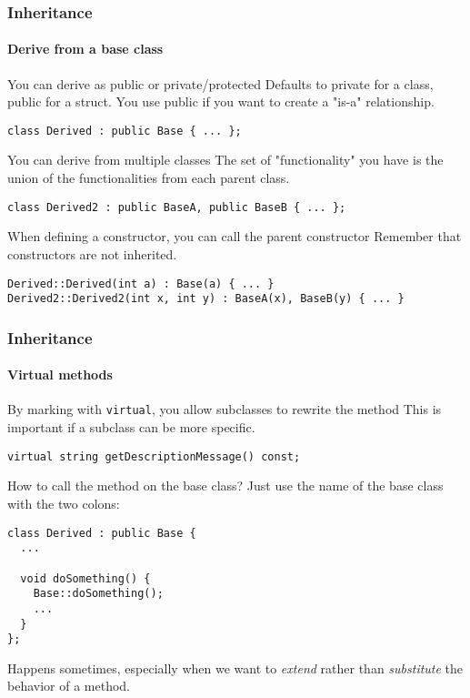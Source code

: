 \begin{frame}
\frametitle{Inheritance}
\framesubtitle{Derive from a base class}

\begin{block}{You can derive as public or private/protected}
Defaults to private for a class, public for a struct. You use public if you want to create a "is-a" relationship.

{\scriptsize 
\texttt{class Derived : public Base \{ ... \}; }
}
\end{block}
\pause
\begin{block}{You can derive from multiple classes}
The set of "functionality" you have is the union of the functionalities from each parent class.

{\scriptsize 
\texttt{class Derived2 : public BaseA, public BaseB \{ ... \}; }
}
\end{block}
\pause
\begin{block}{When defining a constructor, you can call the parent constructor}
Remember that constructors are not inherited.

\medskip

{\scriptsize 
\texttt{Derived::Derived(int a) : Base(a) \{ ... \} } \\
\texttt{Derived2::Derived2(int x, int y) : BaseA(x), BaseB(y) \{ ... \} }
}
\end{block}
\end{frame}

\begin{frame}[fragile]
\frametitle{Inheritance}
\framesubtitle{Virtual methods}

\begin{block}{By marking with \texttt{virtual}, you allow subclasses to rewrite the method}
This is important if a subclass can be more specific.

{\scriptsize 
\texttt{virtual string getDescriptionMessage() const; }
}
\end{block}
\pause
\begin{block}{How to call the method on the base class?}
Just use the name of the base class with the two colons:
{\scriptsize 
\begin{verbatim}
class Derived : public Base {
  ...
  
  void doSomething() {
    Base::doSomething();
    ...
  }
};
\end{verbatim}
}
Happens sometimes, especially when we want to {\em extend} rather than {\em substitute} the behavior of a method.
\end{block}
\end{frame}

